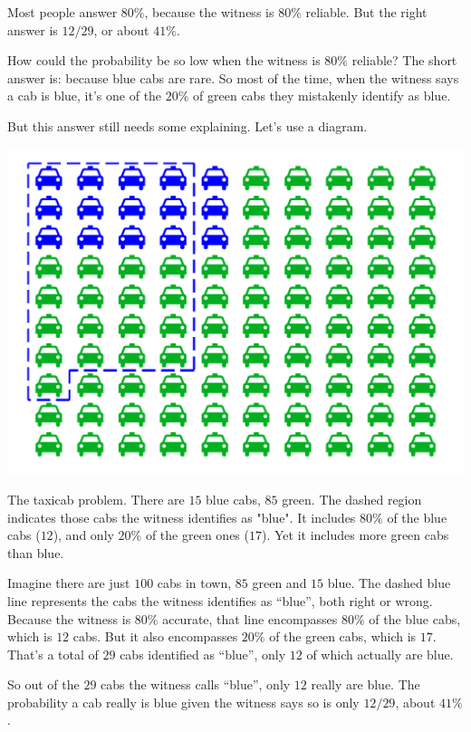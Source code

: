 \documentclass[justified]{tufte-book}
\theoremstyle{definition}
\theoremstyle{definition}
\theoremstyle{definition}
\theoremstyle{remark}
\begin{document}
Most people answer \(80\%\), because the witness is \(80\%\) reliable.
But the right answer is \(12/29\), or about \(41\%\).

How could the probability be so low when the witness is \(80\%\)
reliable? The short answer is: because blue cabs are rare. So most of
the time, when the witness says a cab is blue, it's one of the \(20\%\)
of green cabs they mistakenly identify as blue.

But this answer still needs some explaining. Let's use a diagram.

\begin{marginfigure}
\includegraphics{_main_files/figure-latex/taxigrid-11} \caption[The taxicab problem]{The taxicab problem. There are $15$ blue cabs, $85$ green. The dashed region indicates those cabs the witness identifies as "blue". It includes $80\%$ of the blue cabs ($12$), and only $20\%$ of the green ones ($17$). Yet it includes more green cabs than blue.}\label{fig:taxigrid}
\end{marginfigure}

Imagine there are just \(100\) cabs in town, \(85\) green and \(15\)
blue. The dashed blue line represents the cabs the witness identifies as
``blue'', both right or wrong. Because the witness is \(80\%\) accurate,
that line encompasses \(80\%\) of the blue cabs, which is \(12\) cabs.
But it also encompasses \(20\%\) of the green cabs, which is \(17\).
That's a total of \(29\) cabs identified as ``blue'', only \(12\) of
which actually are blue.

So out of the \(29\) cabs the witness calls ``blue'', only \(12\) really
are blue. The probability a cab really is blue given the witness says so
is only \(12/29\), about \(41\%\).
\end{document}

